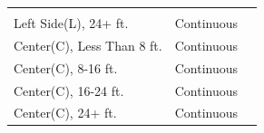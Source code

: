 \documentclass[]{article}
\begin{document}
\begin{longtable}[]{@{}lll@{}}
\begin{minipage}[t]{0.46\columnwidth}
\end{minipage}\tabularnewline
\begin{minipage}[t]{0.32\columnwidth}\raggedright\strut
Left Side(L), 24+ ft.\strut
\end{minipage} & \begin{minipage}[t]{0.13\columnwidth}\raggedright\strut
Continuous\strut
\end{minipage} & \begin{minipage}[t]{0.46\columnwidth}\raggedright\strut
\strut
\end{minipage}\tabularnewline
\begin{minipage}[t]{0.32\columnwidth}\raggedright\strut
Center(C), Less Than 8 ft.\strut
\end{minipage} & \begin{minipage}[t]{0.13\columnwidth}\raggedright\strut
Continuous\strut
\end{minipage} & \begin{minipage}[t]{0.46\columnwidth}\raggedright\strut
\strut
\end{minipage}\tabularnewline
\begin{minipage}[t]{0.32\columnwidth}\raggedright\strut
Center(C), 8-16 ft.\strut
\end{minipage} & \begin{minipage}[t]{0.13\columnwidth}\raggedright\strut
Continuous\strut
\end{minipage} & \begin{minipage}[t]{0.46\columnwidth}\raggedright\strut
\strut
\end{minipage}\tabularnewline
\begin{minipage}[t]{0.32\columnwidth}\raggedright\strut
Center(C), 16-24 ft.\strut
\end{minipage} & \begin{minipage}[t]{0.13\columnwidth}\raggedright\strut
Continuous\strut
\end{minipage} & \begin{minipage}[t]{0.46\columnwidth}\raggedright\strut
\strut
\end{minipage}\tabularnewline
\begin{minipage}[t]{0.32\columnwidth}\raggedright\strut
Center(C), 24+ ft.\strut
\end{minipage} & \begin{minipage}[t]{0.13\columnwidth}\raggedright\strut
Continuous\strut
\end{minipage} & \begin{minipage}[t]{0.46\columnwidth}\raggedright\strut

\end{minipage}
\end{longtable}
\end{document}
